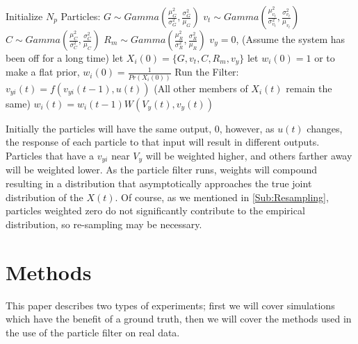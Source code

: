 \documentclass{article}
\begin{document}
\begin{algorithmic}
\STATE Initialize $N_p$ Particles:
    \STATE $G \sim Gamma(\frac{\mu^2_G}{\sigma^2_G}, \frac{\sigma^2_G}{\mu_G})$
    \STATE $v_t \sim Gamma(\frac{\mu^2_{v_t}}{\sigma^2_{v_t}}, \frac{\sigma^2_{v_t}}{\mu_{v_t}})$
    \STATE $C \sim Gamma(\frac{\mu^2_C}{\sigma^2_C}, \frac{\sigma^2_C}{\mu_C})$
    \STATE $R_m \sim Gamma(\frac{\mu^2_R}{\sigma^2_R}, \frac{\sigma^2_R}{\mu_R})$
    \STATE $v_y = 0$, (Assume the system has been off for a long time)
    \STATE let $X_i(0) = \{G, v_t, C, R_m, v_y\}$
    \STATE let $w_i(0) = 1$ or to make a flat prior, $w_i(0) = \frac{1}{Pr(X_i(0))}$ 
\ENDFOR
\STATE Run the Filter:
        \STATE $v_{yi}(t) = f(v_{yi}(t-1), u(t))$
        \STATE (All other members of $X_i(t)$ remain the same)
        \STATE $w_i(t) = w_i(t-1)W(V_y(t), v_y(t))$
    \ENDFOR
\ENDFOR
\end{algorithmic}

Initially the particles will have the same output, $0$, however, as $u(t)$
changes, the response of each particle to that input will result in different
outputs. Particles that have a $v_{yi}$ near $V_y$ will be weighted higher,
and others farther away will be weighted lower. As the particle filter
runs, weights will compound resulting in a distribution that asymptotically
approaches the true joint distribution of the $X(t)$.  Of course, as we
mentioned in \ref{Sub:Resampling}, particles weighted zero do not significantly
contribute to the empirical distribution, so re-sampling may be necessary.

\section{Methods}
This paper describes two types of experiments; first we will cover
simulations which have the benefit of a ground truth, then we will
cover the methods used in the use of the particle filter on real data.
\end{document}
